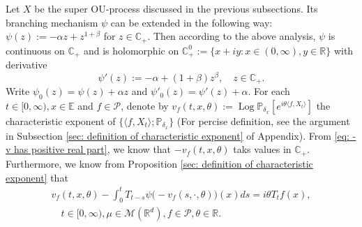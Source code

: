 \documentclass[12pt, a4paper]{amsart}
\theoremstyle{definition}
\numberwithin{equation}{section}
\begin{document}
    Let $X$ be the super OU-process discussed in the previous subsections.
    Its branching mechanism $\psi$ can be extended in the following way: $\psi(z) := -\alpha z + z^{1+\beta}$ for $z\in \mathbb C_+$.
    Then according to the above analysis, $\psi$ is continuous on $\mathbb C_+$ and is holomorphic on $\mathbb C_+^0:=\{x+iy:x \in (0,\infty), y\in \mathbb R\}$ with derivative
\begin{equation}
\label{eq: deriavetive of the Poission part}
    \psi'(z) := -\alpha + (1+\beta)z^{\beta},
    \quad z\in \mathbb C_+.
\end{equation}
Write $\psi_0(z) = \psi(z) + \alpha z$ and $\psi'_0(z) = \psi'(z) + \alpha$.
    For each $t\in [0,\infty), x\in \mathbb E$ and $f \in \mathcal{P}$, denote by $v_f(t,x,\theta):= \operatorname{Log} \mathbb P_{\delta_x}[e^{i\theta \langle f, X_t\rangle}]$ the characteristic exponent of $\{\langle f,X_t \rangle; \mathbb P_{\delta_x}\}$
    (For percise definition, see the argument in Subsection \ref{sec: definition of characteristic exponent} of Appendix).
    From \eqref{eq: -v has positive real part}, we know that $- v_f(t,x,\theta)$ taks values in $\mathbb C_+$.
    Furthermore, we know from Proposition \ref{sec: definition of characteristic exponent} that
\begin{align}\label{charequation}
    v_f(t,x,\theta)-\int_0^t T_{t-s} \psi \big(-v_f(s,\cdot,\theta)\big)(x)ds
    =i\theta T_tf(x),
    \\ \quad t\in [0,\infty), \mu\in \mathcal M(\mathbb R^d), f\in \mathcal P, \theta \in \mathbb R.
\end{align}
\end{document}
